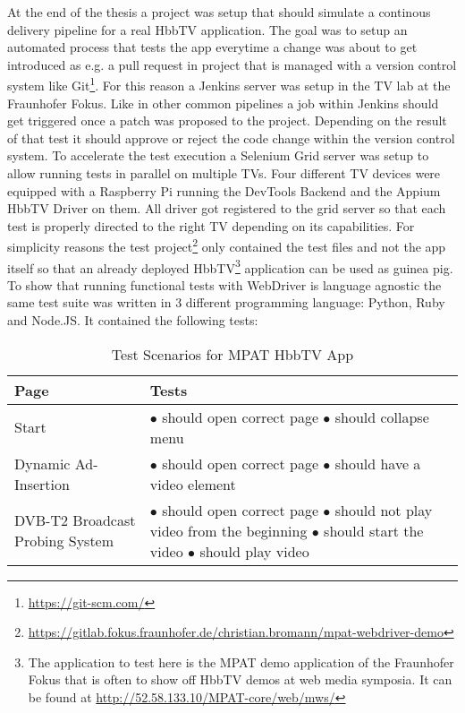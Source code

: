 At the end of the thesis a project was setup that should simulate a continous delivery pipeline for a real HbbTV application. The goal was to setup an automated process that tests the app everytime a change was about to get introduced as e.g. a pull request in project that is managed with a version control system like Git\footnote{\url{https://git-scm.com/}}. For this reason a Jenkins server was setup in the TV lab at the Fraunhofer Fokus. Like in other common pipelines a job within Jenkins should get triggered once a patch was proposed to the project. Depending on the result of that test it should approve or reject the code change within the version control system. To accelerate the test execution a Selenium Grid server was setup to allow running tests in parallel on multiple TVs. Four different TV devices were equipped with a Raspberry Pi running the DevTools Backend and the Appium HbbTV Driver on them. All driver got registered to the grid server so that each test is properly directed to the right TV depending on its capabilities. For simplicity reasons the test project\footnote{\url{https://gitlab.fokus.fraunhofer.de/christian.bromann/mpat-webdriver-demo}} only contained the test files and not the app itself so that an already deployed HbbTV\footnote{The application to test here is the MPAT demo application of the Fraunhofer Fokus that is often to show off HbbTV demos at web media symposia. It can be found at \url{http://52.58.133.10/MPAT-core/web/mws/}} application can be used as guinea pig. To show that running functional tests with WebDriver is language agnostic the same test suite was written in 3 different programming language: Python, Ruby and Node.JS. It contained the following tests:

\noindent
\begin{table}[h!]
    \centering
    \begin{tabular}{|p{}|p{}|}
        \hline
        \textbf{Page} & \textbf{Tests} \\
        \hline
        Start &
        $\bullet$ should open correct page \newline
        $\bullet$ should collapse menu \vspace*{0.1cm} \\
        \hline
        Dynamic Ad-Insertion &
        $\bullet$ should open correct page \newline
        $\bullet$ should have a video element \\
        \hline
        DVB-T2 Broadcast Probing System &
        $\bullet$ should open correct page \newline
        $\bullet$ should not play video from the beginning \newline
        $\bullet$ should start the video \newline
        $\bullet$ should play video \\
        \hline
    \end{tabular}
    \caption{Test Scenarios for MPAT HbbTV App}
    \label{tab:table1}
\end{table}


